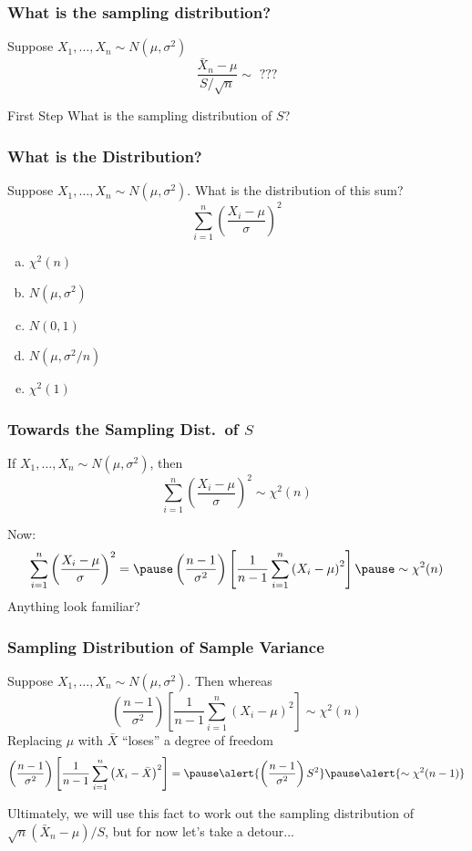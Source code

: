 \documentclass{beamer}
\begin{document}
\begin{frame}
\frametitle{What is the sampling distribution?}
Suppose $X_1, \hdots, X_n \sim N(\mu,\sigma^2)$
 $$\boxed{\frac{\bar{X}_n-\mu}{S/\sqrt{n}}  \sim \mbox{ ???}}$$

 \begin{block}{First Step}
What is the sampling distribution of $S$?
\end{block}
\end{frame}

\begin{frame}
\frametitle{What is the Distribution? }
Suppose $X_1, \hdots, X_n \sim N(\mu,\sigma^2)$. What is the distribution of this sum?
	$$\sum_{i=1}^n \left(\frac{X_i - \mu}{\sigma}\right)^2$$
	
	\begin{enumerate}[(a)]
\item $\chi^2(n)$
\item $N(\mu, \sigma^2)$
\item $N(0,1)$
\item $N(\mu, \sigma^2/n)$
\item $\chi^2(1)$
\end{enumerate}
\end{frame}

\begin{frame}
\frametitle{Towards the Sampling Dist.\ of $S$}
If $X_1, \hdots, X_n \sim N(\mu,\sigma^2)$, then 
$$\sum_{i=1}^n \left(\frac{X_i - \mu}{\sigma}\right)^2 \sim \chi^2(n)$$

Now:
$$\sum_{i=1}^n \left(\frac{X_i - \mu}{\sigma}\right)^2   = \pause \left(\frac{n-1}{\sigma^2}\right) \left[\frac{1}{n-1}\sum_{i=1}^n \left(X_i - \mu\right)^2\right] \pause \sim \chi^2(n) $$
\alert{Anything look familiar?}
\end{frame}

\begin{frame}
\frametitle{Sampling Distribution of Sample Variance}
Suppose $X_1, \hdots, X_n \sim N(\mu,\sigma^2)$. Then whereas
$$\left(\frac{n-1}{\sigma^2}\right) \left[\frac{1}{n-1}\sum_{i=1}^n \left(X_i - \mu\right)^2\right] \sim \chi^2(n)$$
\pause
Replacing $\mu$ with $\bar{X}$ ``loses'' a degree of freedom
	$$\left(\frac{n-1}{\sigma^2}\right) \left[\frac{1}{n-1}\sum_{i=1}^n \left(X_i - \bar{X}\right)^2\right] =\pause\alert{ \left(\frac{n-1}{\sigma^2}\right)S^2} \pause \alert{\sim \chi^2(n-1)}$$


\alert{Ultimately, we will use this fact to work out the sampling distribution of $\sqrt{n}(\bar{X}_n-\mu)/S$, but for now let's take a detour...}
\end{frame}
\end{document}
